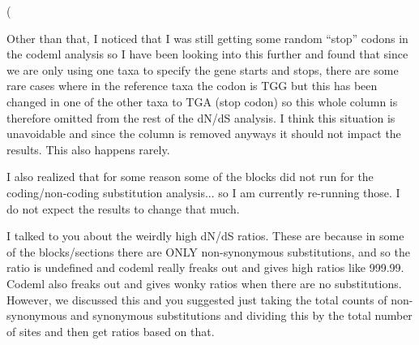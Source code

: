 \left( \documentclass[12pt]{article}
\begin{document}
Other than that, I noticed that I was still getting some random ``stop'' codons in the codeml analysis so I have been looking into this further and found that since we are only using one taxa to specify the gene starts and stops, there are some rare cases where in the reference taxa the codon is TGG but this has been changed in one of the other taxa to TGA (stop codon) so this whole column is therefore omitted from the rest of the dN/dS analysis. 
I think this situation is unavoidable and since the column is removed anyways it should not impact the results. This also happens rarely.

I also realized that for some reason some of the blocks did not run for the coding/non-coding substitution analysis... so I am currently re-running those. I do not expect the results to change that much.

I talked to you about the weirdly high dN/dS ratios. These are because in some of the blocks/sections there are ONLY non-synonymous substitutions, and so the ratio is undefined and codeml really freaks out and gives high ratios like 999.99.
Codeml also freaks out and gives wonky ratios when there are no substitutions.
However, we discussed this and you suggested just taking the total counts of non-synonymous and synonymous substitutions and dividing this by the total number of sites and then get ratios based on that.
\end{document}

